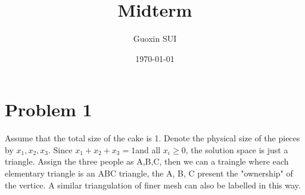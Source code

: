 \documentclass{article}
\title{Midterm}
\author{Guoxin SUI}
\date{\today}
\newenvironment{answer}{\par\color{ForestGreen}}{\par}
\begin{document}
\maketitle
\section{Problem 1}
\begin{answer}
  Assume that the total size of the cake is 1. Denote the physical size of the pieces by $x_1, x_2, x_3$. Since $x_1 + x_2 + x_3 = 1 $and all $x_i \geq 0$, the solution space is just a triangle. Assign the three people as A,B,C, then we can a traingle where each elementary triangle is an ABC triangle, the A, B, C present the "ownership" of the vertice. A similar triangulation of finer mesh can also be labelled in this way.
\end{answer}
\end{document}
